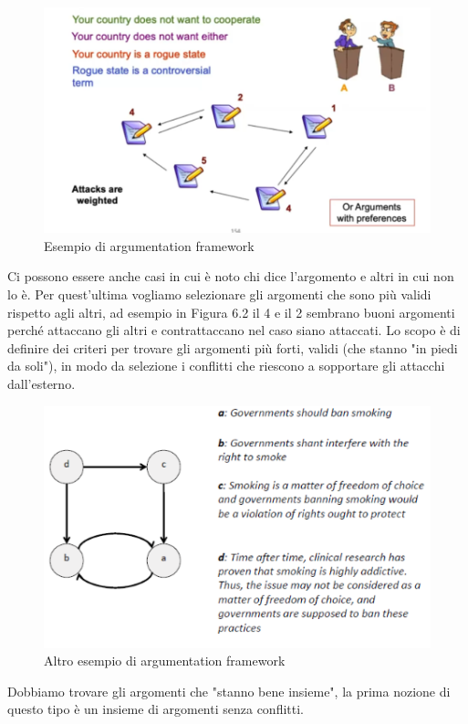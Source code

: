 \begin{figure}[H]
    \centering
    \includegraphics[width=12cm, keepaspectratio]{capitoli/img/Cap6/arg2.png}
    \caption{Esempio di argumentation framework}
\end{figure}
Ci possono essere anche casi in cui è noto chi dice l'argomento e altri in cui
non lo è. Per quest'ultima vogliamo selezionare gli argomenti che sono più
validi rispetto agli altri, ad esempio in Figura 6.2 il 4 e il 2 sembrano buoni
argomenti perché attaccano gli altri e contrattaccano nel caso siano attaccati.
Lo scopo è di definire dei criteri per trovare gli argomenti più forti, validi
(che stanno "in piedi da soli"), in modo da selezione i conflitti che riescono a
sopportare gli attacchi dall'esterno.

\begin{figure}[H]
    \centering
    \includegraphics[width=12cm, keepaspectratio]{capitoli/img/Cap6/arg3.png}
    \caption{Altro esempio di argumentation framework}
\end{figure}

Dobbiamo trovare gli argomenti che "stanno bene insieme", la prima nozione di
questo tipo è un insieme di argomenti senza conflitti.

